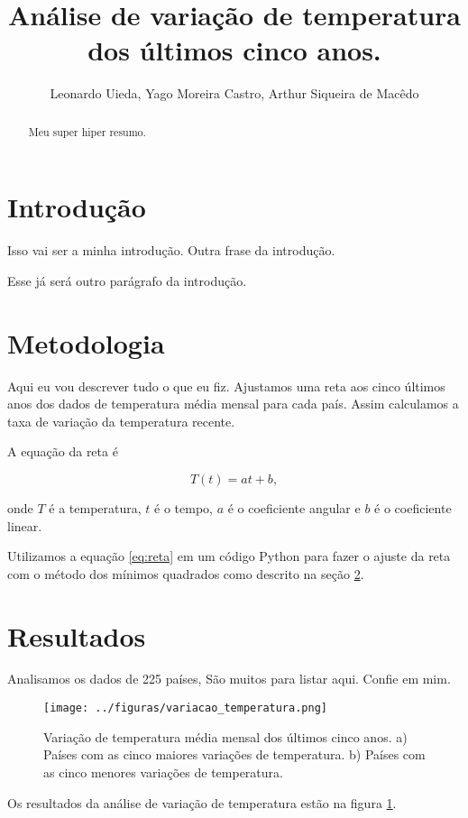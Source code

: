 \documentclass{article}
\begin{document}
\title{Análise de variação de temperatura dos últimos cinco anos.}
\author{Leonardo Uieda, Yago Moreira Castro, Arthur Siqueira de Macêdo}

\maketitle

\begin{abstract}
Meu super hiper resumo.

\end{abstract}

\section{Introdução}
\label{sec:intro}
Isso vai ser a minha introdução.
Outra frase da introdução.

Esse já será outro parágrafo da introdução.

\section{Metodologia}
\label{sec:metodologia}
Aqui eu vou descrever tudo o que eu fiz.
Ajustamos uma reta aos cinco últimos anos dos dados
de temperatura média mensal para cada país.
Assim calculamos a taxa de variação da temperatura recente.

A equação da reta é

\begin{equation}
T(t) = a t + b,
\label{eq:reta}
\end{equation}

\noindent
onde $T$ é a temperatura, $t$ é o tempo, 
$a$ é o coeficiente angular e $b$ é o coeficiente linear.

Utilizamos a equação \ref{eq:reta} em um código Python para fazer 
o ajuste da reta com o método dos mínimos quadrados como descrito na seção \ref{sec:metodologia}.

\section{Resultados}
\label{sec:resultados}

Analisamos os dados de 225 países, São muitos para listar aqui. Confie em mim.

\begin{figure}[!htb] %
	\centering
	\texttt{[image: ../figuras/variacao\_temperatura.png]}
	\caption{
		Variação de temperatura média mensal dos últimos cinco anos. 
		a) Países com as cinco maiores variações de temperatura.
		b) Países com as cinco menores variações de temperatura.
	}
\label{fig:varia_temp}
\end{figure} 

Os resultados da análise de variação de temperatura estão na figura \ref{fig:varia_temp}.
\end{document}
